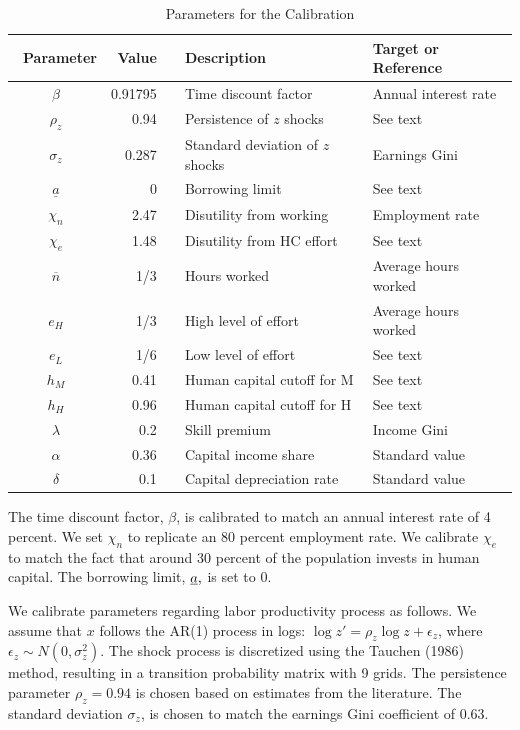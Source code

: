 \documentclass[12pt]{article}
\begin{document}
\begin{table}
\noindent{}%
\noindent\begin{minipage}[t]{1\columnwidth}%
\begin{center}
\caption{\protect\label{tbl:para}Parameters for the Calibration}

\begin{tabular}{crrll}
\toprule 
~Parameter  & Value  &  & Description  & Target or Reference\tabularnewline
\midrule 
$\beta$  & 0.91795 &  & Time discount factor  & Annual interest rate\tabularnewline
$\rho_{z}$  & 0.94  &  & Persistence of $z$ shocks  & See text\tabularnewline
$\sigma_{z}$  & 0.287  &  & Standard deviation of $z$ shocks  & Earnings Gini\tabularnewline
$\underline{a}$  & 0  &  & Borrowing limit  & See text\tabularnewline
$\chi_{n}$  & 2.47  &  & Disutility from working  & Employment rate\tabularnewline
$\chi_{e}$  & 1.48  &  & Disutility from HC effort  & See text\tabularnewline
$\overline{n}$  & 1/3  &  & Hours worked  & Average hours worked\tabularnewline
$e_{H}$  & 1/3  &  & High level of effort  & Average hours worked\tabularnewline
$e_{L}$  & 1/6  &  & Low level of effort  & See text\tabularnewline
$h_{M}$  & 0.41  &  & Human capital cutoff for M  & See text\tabularnewline
$h_{H}$  & 0.96  &  & Human capital cutoff for H  & See text\tabularnewline
$\lambda$  & 0.2  &  & Skill premium  & Income Gini\tabularnewline
$\alpha$  & 0.36  &  & Capital income share  & Standard value\tabularnewline
$\delta$  & 0.1  &  & Capital depreciation rate  & Standard value\tabularnewline
\bottomrule
\end{tabular}
\par\end{center}%
\end{minipage}
\end{table}

The time discount factor, $\beta$, is calibrated to match an annual
interest rate of 4 percent. We set $\chi_{n}$ to replicate an 80
percent employment rate. We calibrate $\chi_{e}$ to match the fact
that around 30 percent of the population invests in human capital.
The borrowing limit, $\text{\underbar{\ensuremath{a}},}$ is set to
0. 

We calibrate parameters regarding labor productivity process as follows.
We assume that $x$ follows the AR(1) process in logs: $\log z'=\rho_{z}\log z+\epsilon_{z}$,
where $\epsilon_{z}\sim N(0,\sigma_{z}^{2})$. The shock process is
discretized using the Tauchen (1986) method, resulting in a transition
probability matrix with 9 grids. The persistence parameter $\rho_{z}=0.94$
is chosen based on estimates from the literature. The standard deviation
$\sigma_{z}$, is chosen to match the earnings Gini coefficient of 0.63.
\end{document}
